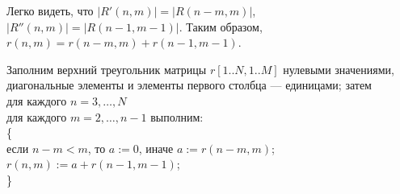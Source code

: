 Легко видеть, что $|R'(n,m)|= |R(n-m,m)|$, $|R''(n,m)|=|R(n-1,m-1)|$. Таким образом, $r(n,m)= r(n-m, m) + r(n-1, m-1)$.

Заполним верхний треугольник матрицы $r[1..N, 1..M]$ нулевыми значениями, диагональные элементы и элементы первого столбца --- единицами; затем\\
для каждого $n=3,…,N$\\
для каждого $m=2,…, n-1$ выполним:\\
\{\\
если $n-m<m$, то $a:=0$, иначе $a:=r(n-m,m)$;\\
$r(n,m):= a + r(n-1, m-1)$;\\
\}\\

